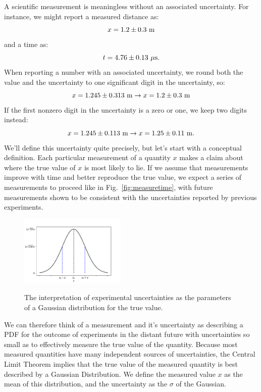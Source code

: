 \documentclass[12pt,oneside]{book}
\begin{document}
A scientific measurement is meaningless without an associated uncertainty.   For instance, we might report a measured distance as:
\begin{displaymath}
x = 1.2 \pm 0.3~\rm m
\end{displaymath}
and a time as:
\begin{displaymath}
t = 4.76 \pm 0.13~\rm \mu s.
\end{displaymath}
When reporting a number with an associated uncertainty, we round both the value and the uncertainty to one significant digit in the uncertainty, so:
\begin{displaymath}
x = 1.245 \pm 0.313~{\rm m} \to x = 1.2 \pm 0.3~{\rm m} 
\end{displaymath}
If the first nonzero digit in the uncertainty is a zero or one, we keep two digits instead:
\begin{displaymath}
x = 1.245 \pm 0.113~{\rm m} \to x = 1.25 \pm 0.11~{\rm m}.
\end{displaymath}
We'll define this uncertainty quite precisely, but let's start with a
conceptual definition.  Each particular measurement of a quantity $x$
makes a claim about where the true value of $x$ is most likely to lie.
If we assume that measurements improve with time and better reproduce
the true value, we expect a series of measurements to proceed like in
Fig.~\ref{fig:measuretime}, with future measurements shown to be
consistent with the uncertainties reported by previous experiments.

\begin{figure}[htbp]
\begin{center}
{\includegraphics[width=0.45\textwidth]{figs/stdunc.pdf}}
\end{center}
\caption{\label{fig:stdunc}  The interpretation of experimental uncertainties as the parameters of a Gaussian distribution for the true value.}
\end{figure}

We can therefore think of a measurement and it's uncertainty as
describing a PDF for the outcome of experiments in the distant future
with uncertainties so small as to effectively measure the true value
of the quantity.  Because most measured quantities have many
independent sources of uncertainties, the Central Limit Theorem
implies that the true value of the measured quantity is best described
by a Gaussian Distribution.  We define the measured value $x$ as the
mean of this distribution, and the uncertainty as the $\sigma$ of the
Gaussian.
\end{document}
